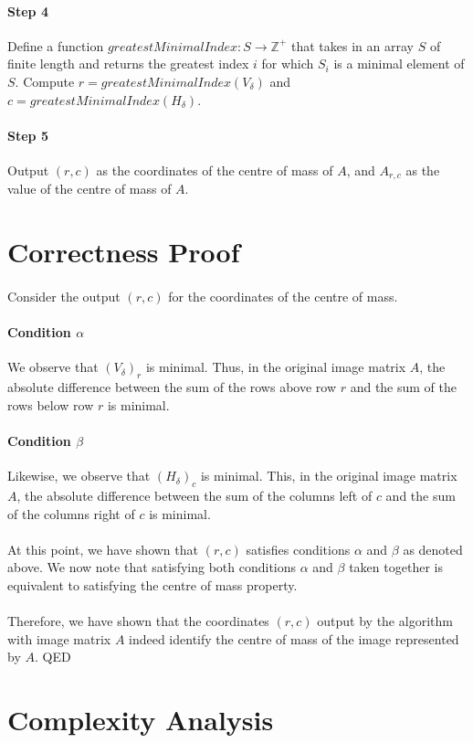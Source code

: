 \documentclass[]{article}
\begin{document}
		\paragraph{Step 4}
		Define a function $greatestMinimalIndex: S \to \mathbb{Z}^+$ that takes in an array $S$ of finite length and returns the greatest index $i$ for which $S_i$ is a minimal element of $S$. Compute $r = greatestMinimalIndex(V_\delta)$ and $c = greatestMinimalIndex(H_\delta)$.
		
		\paragraph{Step 5}
		Output $(r,c)$ as the coordinates of the centre of mass of $A$, and $A_{r,c}$ as the value of the centre of mass of $A$.
			
	
	\section{Correctness Proof}
		\paragraph{}
		Consider the output $(r,c)$ for the coordinates of the centre of mass. 
		
		\paragraph{Condition $\alpha$}
		We observe that $(V_\delta)_r$ is minimal. Thus, in the original image matrix $A$, the absolute difference between the sum of the rows above row $r$ and the sum of the rows below row $r$ is minimal.
		
		\paragraph{Condition $\beta$}
		Likewise, we observe that $(H_\delta)_c$ is minimal. This, in the original image matrix $A$, the absolute difference between the sum of the columns left of $c$ and the sum of the columns right of $c$ is minimal.
		
		\paragraph{}
		At this point, we have shown that $(r,c)$ satisfies conditions $\alpha$ and $\beta$ as denoted above. We now note that satisfying both conditions $\alpha$ and $\beta$ taken together is equivalent to satisfying the centre of mass property.
		
		\paragraph{}
		Therefore, we have shown that the coordinates $(r,c)$ output by the algorithm with image matrix $A$ indeed identify the centre of mass of the image represented by $A$. QED
	
	\section{Complexity Analysis}
	
	
\end{document}
